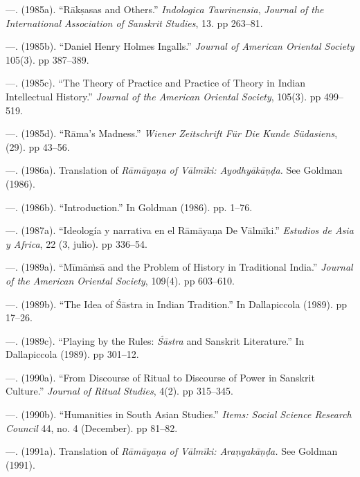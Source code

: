 \begin{thebibliography}{99}
 \item —. (1985a). “Rākṣasas and Others.” \textit{Indologica Taurinensia}, \textit{Journal of the International Association of Sanskrit Studies}, 13. pp 263–81.

 \item —. (1985b). “Daniel Henry Holmes Ingalls.” \textit{Journal of American Oriental Society }105(3). pp 387–389.

 \item —. (1985c). “The Theory of Practice and Practice of Theory in Indian Intellectual History.” \textit{Journal of the American Oriental Society}, 105(3). pp 499–519.

 \item —. (1985d). “Rāma’s Madness.” \textit{Wiener Zeitschrift Für Die Kunde Südasiens}, (29). pp 43–56.

 \item —. (1986a). Translation of \textit{Rāmāyaṇa of Vālmīki: Ayodhyākāṇḍa.} See Goldman (1986).

 \item —. (1986b). “Introduction.” In Goldman (1986). pp. 1–76.

 \item —. (1987a). “Ideología y narrativa en el Rāmāyaṇa De Vālmīki.” \textit{Estudios de Asia y Africa}, 22 (3, julio). pp 336–54.

 \item —. (1989a). “Mīmāṁsā and the Problem of History in Traditional India.” \textit{Journal of the American Oriental Society}, 109(4). pp 603–610.

 \item —. (1989b). “The Idea of Śāstra in Indian Tradition.” In Dallapiccola (1989). pp 17–26.

 \item —. (1989c). “Playing by the Rules: \textit{Śāstra} and Sanskrit Literature.” In Dallapiccola (1989). pp 301–12.

 \item —. (1990a). “From Discourse of Ritual to Discourse of Power in Sanskrit Culture.” \textit{Journal of Ritual Studies}, 4(2). pp 315–345.

 \item —. (1990b). “Humanities in South Asian Studies.” \textit{Items: Social Science Research Council} 44, no. 4 (December). pp 81–82.

 \item —. (1991a). Translation of \textit{Rāmāyaṇa of Vālmīki: Araṇyakāṇḍa.} See Goldman (1991).


\end{thebibliography}
